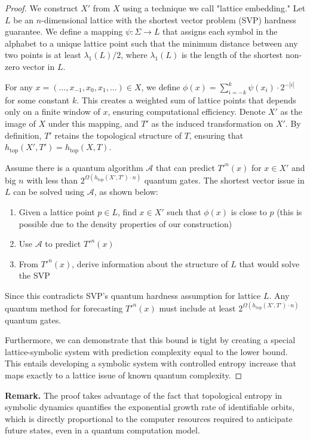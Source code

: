 \documentclass[12pt,a4paper]{article}
\begin{document}
\begin{proof}
We construct $X'$ from $X$ using a technique we call "lattice embedding." Let $L$ be an $n$-dimensional lattice with the shortest vector problem (SVP) hardness guarantee. We define a mapping $\psi: \Sigma \rightarrow L$ that assigns each symbol in the alphabet to a unique lattice point such that the minimum distance between any two points is at least $\lambda_1(L)/2$, where $\lambda_1(L)$ is the length of the shortest non-zero vector in $L$.

For any $x = (..., x_{-1}, x_0, x_1, ...) \in X$, we define $\phi(x) = \sum_{i=-k}^{k} \psi(x_i) \cdot 2^{-|i|}$ for some constant $k$. This creates a weighted sum of lattice points that depends only on a finite window of $x$, ensuring computational efficiency. Denote $X'$ as the image of $X$ under this mapping, and $T'$ as the induced transformation on $X'$. By definition, $T'$ retains the topological structure of $T$, ensuring that $h_{\text{top}}(X',T') = h_{\text{top}}(X,T)$.

Assume there is a quantum algorithm $\mathcal{A}$ that can predict $T'^n(x)$ for $x \in X'$ and big $n$ with less than $2^{\Omega(h_{\text{top}}(X',T') \cdot n)}$ quantum gates. The shortest vector issue in $L$ can be solved using $\mathcal{A}$, as shown below:

\begin{enumerate}
\item Given a lattice point $p \in L$, find $x \in X'$ such that $\phi(x)$ is close to $p$ (this is possible due to the density properties of our construction)
\item Use $\mathcal{A}$ to predict $T'^n(x)$
\item From $T'^n(x)$, derive information about the structure of $L$ that would solve the SVP
\end{enumerate}

Since this contradicts SVP's quantum hardness assumption for lattice $L$. Any quantum method for forecasting $T'^n(x)$ must include at least $2^{\Omega(h_{\text{top}}(X',T') \cdot n)}$ quantum gates.

Furthermore, we can demonstrate that this bound is tight by creating a special lattice-symbolic system with prediction complexity equal to the lower bound. This entails developing a symbolic system with controlled entropy increase that maps exactly to a lattice issue of known quantum complexity.
\end{proof}
\noindent
\textbf{Remark. } The proof takes advantage of the fact that topological entropy in symbolic dynamics quantifies the exponential growth rate of identifiable orbits, which is directly proportional to the computer resources required to anticipate future states, even in a quantum computation model.
\end{document}
